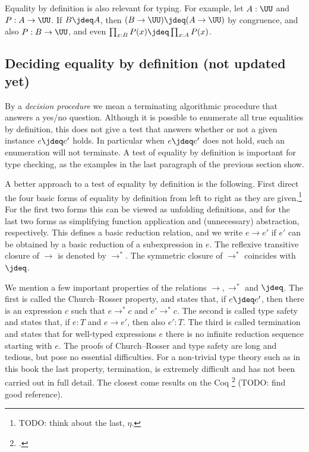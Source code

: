 Equality by definition is also relevant for typing.
For example, let $A: \UU$ and $P: A\to\UU$. If $B\jdeq A$,
then  $ (B\to\UU)\jdeq(A\to\UU)$ by congruence, and also $P: B\to\UU$,
and even $\prod_{x:B} P(x) \jdeq \prod_{x:A} P(x)$.



\subsection{Deciding equality by definition (not updated yet)}
\label{sec:defeq-computation}

By a \emph{decision procedure} we mean a terminating algorithmic procedure that 
answers a yes/no question.
Although it is possible to enumerate all true equalities by definition,
this does not give a test that answers whether or not a given instance $e\jdeq e'$ holds.
In particular when $e\jdeq e'$ does not hold, such an enumeration will not terminate.
A test of equality by definition is important for type checking,
as the examples in the last paragraph of the previous section show.

A better approach to a test of equality by definition is the following.
First direct the four basic forms of equality by definition from left to right
as they are given.\footnote{%
TODO: think about the last, $\eta$.}
For the first two forms this can be viewed as unfolding definitions,
and for the last two forms as simplifying function application and (unnecessary) 
abstraction, respectively.
This defines a basic reduction relation, and we write $e\to e'$ if $e'$ can
be obtained by a basic reduction of a subexpression in $e$. 
The reflexive transitive closure of $\to$ is denoted by $\to^*$.
The symmetric closure of $\to^*$ coincides with $\jdeq$.

We mention a few important properties of the relations $\to,\to^*$ and $\jdeq$.
The first is called the Church--Rosser property, and states that,
if $e\jdeq e'$, then there is an expression $c$ such that $e\to^* c$
and $e'\to^* c$. The second is called type safety and states that,
if $e:T$ and $e\to e'$, then also $e':T$.
The third is called termination and states that for well-typed expressions $e$
there is no infinite reduction sequence starting with $e$.
The proofs of Church--Rosser and type safety are long and tedious, but pose no essential
difficulties. For a non-trivial type theory such as in this book the last property,
termination, is extremely difficult and has not been carried out in full detail.
The closest come results on the Coq \footcite{Coq} (TODO: find good reference).

